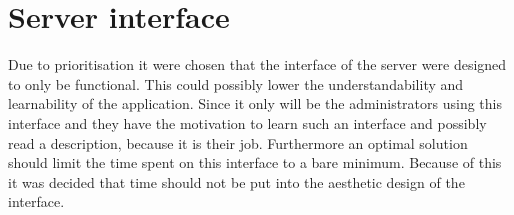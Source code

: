 \section{Server interface}\label{sec:serverInterface}
Due to prioritisation it were chosen that the interface of the server were designed to only be functional. This could possibly lower the understandability and learnability of the application. Since it only will be the administrators using this interface and they have the motivation to learn such an interface and possibly read a description, because it is their job. Furthermore an optimal solution should limit the time spent on this interface to a bare minimum. Because of this it was decided that time should not be put into the aesthetic design of the interface.